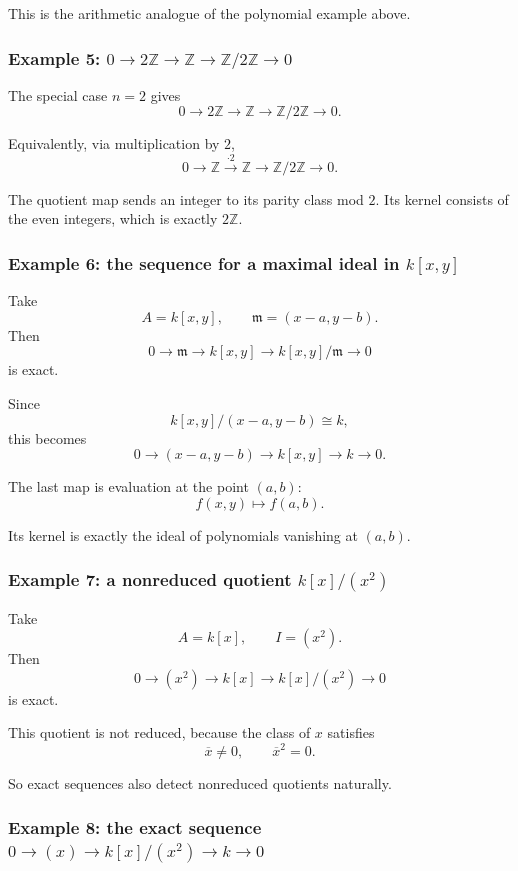 \documentclass[12pt,a4paper]{article}
\theoremstyle{notespace}
\newcommand{\mf}{\mathfrak}
\theoremstyle{definition}
\begin{document}
This is the arithmetic analogue of the polynomial example above.

\subsubsection{Example 5: \(0\to 2\mathbb Z\to \mathbb Z\to \mathbb Z/2\mathbb Z\to 0\)}

The special case \(n=2\) gives
\[
0 \longrightarrow 2\mathbb Z \longrightarrow \mathbb Z \longrightarrow \mathbb Z/2\mathbb Z \longrightarrow 0.
\]

Equivalently, via multiplication by \(2\),
\[
0 \longrightarrow \mathbb Z \xrightarrow{\cdot 2} \mathbb Z \longrightarrow \mathbb Z/2\mathbb Z \longrightarrow 0.
\]

The quotient map sends an integer to its parity class mod \(2\).  
Its kernel consists of the even integers, which is exactly \(2\mathbb Z\).

\subsubsection{Example 6: the sequence for a maximal ideal in \(k[x,y]\)}

Take
\[
A=k[x,y],
\qquad
\mf m=(x-a,y-b).
\]
Then
\[
0 \longrightarrow \mf m \longrightarrow k[x,y] \longrightarrow k[x,y]/\mf m \longrightarrow 0
\]
is exact.

Since
\[
k[x,y]/(x-a,y-b)\cong k,
\]
this becomes
\[
0 \longrightarrow (x-a,y-b) \longrightarrow k[x,y] \longrightarrow k \longrightarrow 0.
\]

The last map is evaluation at the point \((a,b)\):
\[
f(x,y)\longmapsto f(a,b).
\]

Its kernel is exactly the ideal of polynomials vanishing at \((a,b)\).

\subsubsection{Example 7: a nonreduced quotient \(k[x]/(x^2)\)}

Take
\[
A=k[x],
\qquad
I=(x^2).
\]
Then
\[
0 \longrightarrow (x^2) \longrightarrow k[x] \longrightarrow k[x]/(x^2) \longrightarrow 0
\]
is exact.

This quotient is not reduced, because the class of \(x\) satisfies
\[
\overline{x}\neq 0,
\qquad
\overline{x}^2=0.
\]

So exact sequences also detect nonreduced quotients naturally.

\subsubsection{Example 8: the exact sequence \(0\to (x)\to k[x]/(x^2)\to k\to 0\)}
\end{document}
